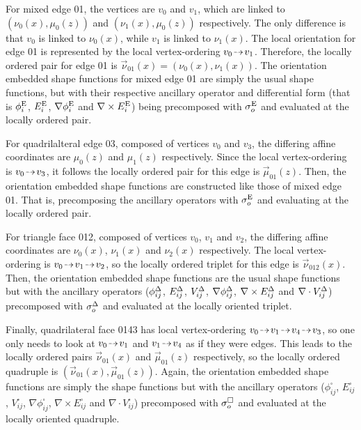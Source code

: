 For mixed edge 01, the vertices are $v_0$ and $v_1$, which are linked to $(\nu_0(x),\mu_0(z))$ and $(\nu_1(x),\mu_0(z))$ respectively.
The only difference is that $v_0$ is linked to $\nu_0(x)$, while $v_1$ is linked to $\nu_1(x)$.
The local orientation for edge 01 is represented by the local vertex-ordering $v_0\tdashto v_1$.
Therefore, the locally ordered pair for edge 01 is $\vec{\nu}_{01}(x)=(\nu_0(x),\nu_1(x))$.
The orientation embedded shape functions for mixed edge 01 are simply the usual shape functions, but with their respective ancillary operator and differential form (that is $\phi_i^{\mathrm{E}}$, $E_i^{\mathrm{E}}$, $\nabla\phi_i^{\mathrm{E}}$ and $\nabla\times E_i^{\mathrm{E}}$) being precomposed with $\sigma_o^{\mathrm{E}}$ and evaluated at the locally ordered pair.

For quadrilalteral edge 03, composed of vertices $v_0$ and $v_3$, the differing affine coordinates are $\mu_0(z)$ and $\mu_1(z)$ respectively.
Since the local vertex-ordering is $v_0\tdashto v_3$, it follows the locally ordered pair for this edge is $\vec{\mu}_{01}(z)$.
Then, the orientation embedded shape functions are constructed like those of mixed edge 01.
That is, precomposing the ancillary operators with $\sigma_o^{\mathrm{E}}$ and evaluating at the locally ordered pair.

For triangle face 012, composed of vertices $v_0$, $v_1$ and $v_2$, the differing affine coordinates are $\nu_0(x)$, $\nu_1(x)$ and $\nu_2(x)$ respectively.
The local vertex-ordering is $v_0\tdashto v_1\tdashto v_2$, so the locally ordered triplet for this edge is $\vec{\nu}_{012}(x)$.
Then, the orientation embedded shape functions are the usual shape functions but with the ancillary operators ($\phi_{ij}^\Delta$, $E_{ij}^\Delta$, $V_{ij}^\Delta$, $\nabla\phi_{ij}^\Delta$, $\nabla\times E_{ij}^\Delta$ and $\nabla\cdot V_{ij}^\Delta$) precomposed with $\sigma_o^\Delta$ and evaluated at the locally oriented triplet.

Finally, quadrilateral face 0143 has local vertex-ordering $v_0\tdashto v_1\tdashto v_4\tdashto v_3$, so one only needs to look at $v_0\tdashto v_1$ and $v_1\tdashto v_4$ as if they were edges.
This leads to the locally ordered pairs $\vec{\nu}_{01}(x)$ and $\vec{\mu}_{01}(z)$ respectively, so the locally ordered quadruple is $(\vec{\nu}_{01}(x),\vec{\mu}_{01}(z))$.
Again, the orientation embedded shape functions are simply the shape functions but with the ancillary operators ($\phi_{ij}^\square$, $E_{ij}^\square$, $V_{ij}^\square$, $\nabla\phi_{ij}^\square$, $\nabla\times E_{ij}^\square$ and $\nabla\cdot V_{ij}^\square$) precomposed with $\sigma_o^\square$ and evaluated at the locally oriented quadruple.


